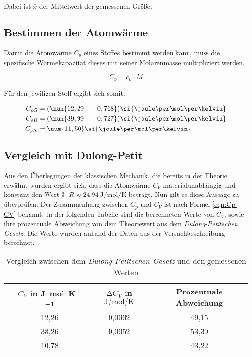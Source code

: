 Dabei ist $\bar{x}$ der Mittelwert der gemessenen Größe.

\subsection{Bestimmen der Atomwärme}

Damit die Atomwärme $C_p$ eines Stoffes bestimmt werden kann, muss die
spezifische Wärmekapazität dieses mit seiner Molarenmasse multipliziert werden.

\begin{equation}
  C_p = c_k\cdot M
\end{equation}

Für den jewiligen Stoff ergibt sich somit:

\begin{align*}
  C_{pG} &= (\num{12,29 +- 0,768})\si{\joule\per\mol\per\kelvin} \\
  C_{pB} &= (\num{39,99 +- 0,727})\si{\joule\per\mol\per\kelvin} \\
  C_{pK} &= \num{11,50}\si{\joule\per\mol\per\kelvin}
\end{align*}

\subsection{Vergleich mit Dulong-Petit}

Aus den Überlegungen der klassischen Mechanik, die bereits in der Theorie
erwähnt wurden ergibt sich, dass die Atomwärme $C_V$ materialunabhängig
und konstant den Wert $3\cdot R \approx \SI{24,94}{\joule\per\mol\per\kelvin}$
beträgt. Nun gilt es diese Aussage zu überprüfen.
Der Zusammenhang zwischen $C_p$ und $C_V$ ist nach Formel \eqref{eqn:Cp-CV} bekannt.
In der folgenden Tabelle sind die berechneten Werte von $C_V$, sowie ihre
prozentuale Abweichung von dem Theoriewert aus dem \emph{Dulong-Petitschen
Gesetz}. Die Werte wurden anhand der Daten aus der Versuchbeschreibung
\cite{anleitung} berechnet.

\begin{table}
 \centering
 \label{tab:Vergleich}
 \begin{tabular}[width=0.4\textwidth]{S S[table-format=2.2] S[table-format=1.4]
 S[table-format=2.2]}
     \toprule
     {} & {$C_V$ in \si{\joule\per\mol\per\kelvin}}  & {$\increment C_V$ in
     $\si{\joule\per\mol\per\kelvin}$} & {\small{Prozentuale Abweichung}} \\
     \midrule
      & 12,26 & 0,0002 & \text{--}49,15 \\
      & 38,26 & 0,0052 & \text{+}53,39 \\
      & 10,78 & \text{\,\,\,\,\,\,\,\,\,\,\,\,\,\,\,\,\,\,\,\textbf{---}} & \text{--}43,22 \\
     \bottomrule
   \end{tabular}
  \caption{Vergleich zwischen dem \emph{Dulong-Petitschen Gesetz}
  und den gemessenen Werten}
\end{table}

